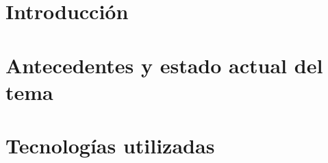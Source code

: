 \documentclass[spanish,a4paper,14pt,oneside]{extreport}
\begin{document}
  \renewcommand{\thepage}{\roman{page}}
  \setcounter{page}{1}
   
   
  \tableofcontents
   
  \newpage{\pagestyle{empty}}
   
  \listoffigures
   
  \newpage{\pagestyle{empty}}
   
  \listoftables
   
  \newpage{\pagestyle{empty}}
   
  \renewcommand{\thepage}{\arabic{page}}
  \setcounter{page}{1}
   
   
  \chapter{Introducción}
  \label{chapter:intro}
   
  
   
   
  \chapter{Antecedentes y estado actual del tema}
  \label{chapter:Estadodelarte}
   
  
   
  \newpage{\pagestyle{empty}}
  \thispagestyle{empty}
   
  \chapter{Tecnologías utilizadas}
  \label{chapter:tres}
   
  
   
   
\end{document}
